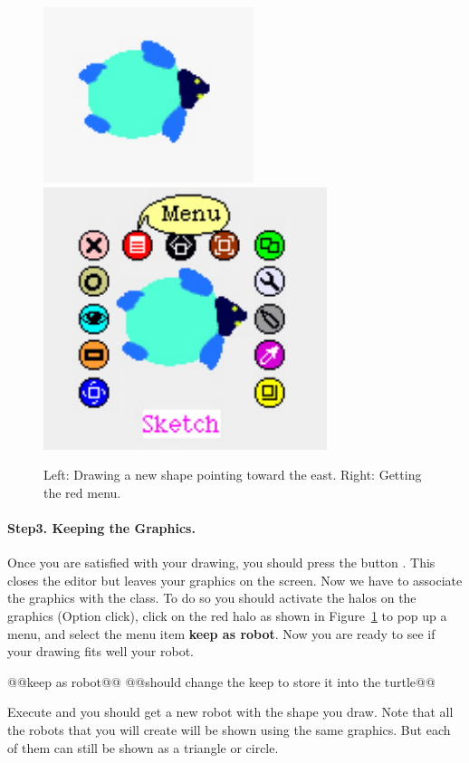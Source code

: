 \begin{figure}
\begin{center}
\includegraphics{luth} \includegraphics{debugMenu}
\end{center}
\caption{Left: Drawing a new shape pointing toward the east. \label{fig:luth} Right: Getting the red menu. \label{fig:redMenu}}
\end{figure}

\paragraph{Step3. Keeping the Graphics.} Once you are satisfied with your drawing, you should press the button . This closes the editor but leaves your graphics on the screen. Now we have to associate the graphics with the \ct{\Turtle} class. To do so you should activate the halos on the graphics (Option click), click on the red halo as shown in Figure~\ref{fig:redMenu} to pop up a menu, and select the menu item \textbf{keep as robot}. Now you are ready to see if your drawing 
fits well your robot. 

@@keep as robot@@
@@should change the keep to store it into the turtle@@

Execute  and you should get a new robot with the shape you draw. Note that all the  robots that you will create will be shown using the same graphics. But each of them can still be shown as a triangle or circle.



